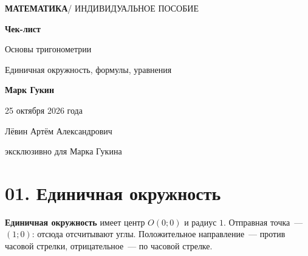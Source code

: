 \documentclass[a4paper,12pt]{article}
\newcommand{\key}[1]{\textcolor{darkaccent}{\textbf{#1}}}
\begin{document}
\begin{titlepage}
\thispagestyle{empty}
\begin{center}
\vspace*{32mm}
{\large\color{softgray}\textbf{МАТЕМАТИКА}\quad / \quad ИНДИВИДУАЛЬНОЕ ПОСОБИЕ}\par
\vspace{26mm}
{\color{darkaccent}\fontsize{35}{42}\selectfont\textbf{Чек-лист}}\par
\vspace{10mm}
{\fontsize{21}{27}\selectfont Основы тригонометрии}\par
\vspace{4mm}
{\large Единичная окружность, формулы, уравнения}\par
\vspace{26mm}
\par
\vspace{14mm}
{\large\textbf{Марк Гукин}}\par
\vspace{8mm}
{\large 25 октября 2026 года}\par
\vfill
{\small\color{softgray} Лёвин Артём Александрович}\par
\vspace{2mm}
{\small\color{textgray} эксклюзивно для Марка Гукина}\par
\vspace{8mm}
\end{center}
\end{titlepage}

\section*{01. Единичная окружность}
\key{Единичная окружность} имеет центр $O(0;0)$ и радиус $1$. Отправная точка~--- $(1;0)$: отсюда отсчитывают углы. Положительное направление~--- против часовой стрелки, отрицательное~--- по часовой стрелке.
\end{document}
